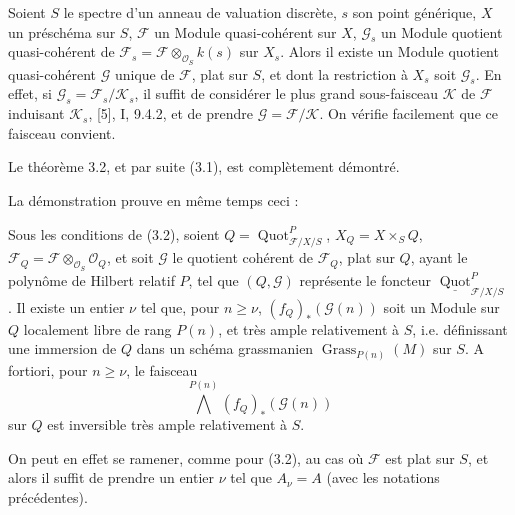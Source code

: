  Soient $S$ le spectre d'un anneau de valuation discrète,
$s$ son point générique, $X$ un préschéma sur $S$, $\mathcal F$ un Module
quasi-cohérent sur $X$, $\mathcal G_s$ un Module quotient quasi-cohérent de
$\mathcal F_s=\mathcal F\otimes_{\mathcal O_S}k(s)$ sur $X_s$. Alors il existe
un Module quotient quasi-cohérent $\mathcal G$ unique de $\mathcal F$, plat sur
$S$, et dont la restriction à $X_s$ soit $\mathcal G_s$.
En effet, si $\mathcal G_s=\mathcal F_s/\mathcal K_s$, il suffit de considérer
le plus grand sous-faisceau $\mathcal K$ de $\mathcal F$ induisant
$\mathcal K_s$, [5], I, 9.4.2, et de prendre
$\mathcal G=\mathcal F/\mathcal K$. On vérifie facilement que ce faisceau
convient.

Le théorème 3.2, et par suite (3.1), est complètement démontré.

La démonstration prouve en même temps ceci :

 Sous les conditions de (3.2), soient
$Q=\operatorname{Quot}^P_{\mathcal F/X/S}$, $X_Q=X\times_SQ$,
$\mathcal F_Q=\mathcal F\otimes_{\mathcal O_S}\mathcal O_Q$, et soit
$\mathcal G$ le quotient cohérent de $\mathcal F_Q$, plat sur $Q$, ayant le
polynôme de Hilbert relatif $P$, tel que $(Q,\mathcal G)$ représente le foncteur
$\underline{\operatorname{Quot}}^P_{\mathcal F/X/S}$. Il existe un entier
$\nu$ tel que, pour $n\geq\nu$, $(f_Q)_*(\mathcal G(n))$ soit un Module sur $Q$
localement libre de rang $P(n)$, et très ample relativement à $S$, i.e.
définissant une immersion de $Q$ dans un schéma grassmanien
$\operatorname{Grass}_{P(n)}(M)$ sur $S$. A fortiori, pour $n\geq\nu$, le
faisceau
\[
\bigwedge^{P(n)}(f_Q)_*(\mathcal G(n))
\]
sur $Q$ est inversible très ample relativement à $S$.

On peut en effet se ramener, comme pour (3.2), au cas où $\mathcal F$ est plat
sur $S$, et alors il suffit de prendre un entier $\nu$ tel que $A_\nu=A$ (avec
les notations précédentes).

